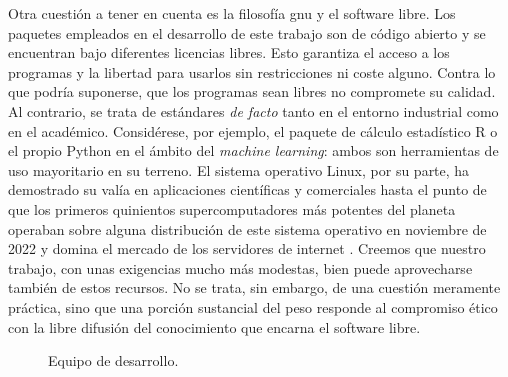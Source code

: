 Otra cuestión a tener en cuenta es la filosofía \ac{gnu} y el software libre. Los paquetes empleados en el desarrollo de este trabajo son de código abierto y se encuentran bajo diferentes licencias libres. Esto garantiza el acceso a los programas y la libertad para usarlos sin restricciones ni coste alguno. Contra lo que podría suponerse, que los programas sean libres no compromete su calidad. Al contrario, se trata de estándares \textit{de facto} tanto en el entorno industrial como en el académico. Considérese, por ejemplo, el paquete de cálculo estadístico R \parencite{r2019} o el propio Python en el ámbito del \textit{machine learning}: ambos son herramientas de uso mayoritario en su terreno.  El sistema operativo Linux, por su parte, ha demostrado su valía en aplicaciones científicas y comerciales hasta el punto de que los primeros quinientos supercomputadores más potentes del planeta operaban sobre alguna distribución de este sistema operativo en noviembre de 2022 \parencite{top5002022} y domina el mercado de los servidores de internet \parencite{w3techs2023}. Creemos que nuestro trabajo, con unas exigencias mucho más modestas, bien puede aprovecharse también de estos recursos. No se trata, sin embargo, de una cuestión meramente práctica, sino que una porción sustancial del peso responde al compromiso ético con la libre difusión del conocimiento que encarna el software libre.

\begin{figure}[!ht]
	\centering\small
	\caption{Equipo de desarrollo.}
	\label{fig:neofetch}
\end{figure}

